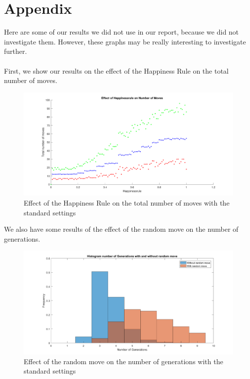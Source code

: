 \section*{Appendix} 

Here are some of our results we did not use in our report, because we did not investigate them.
However, these graphs may be really interesting to investigate further.\\
\\
First, we show our results on the effect of the Happiness Rule on the total number of moves.

\begin{figure}[H]
	\centering
    \includegraphics[width=\textwidth]{happinessregel-aantmov.pdf}
    \caption{Effect of the Happiness Rule on the total number of moves with the standard settings}
    \label{fig:AantGenS}
\end{figure}

We also have some results of the effect of the random move on the number of generations.

\begin{figure}[H]
	\centering
    \includegraphics[width=\textwidth]{histaantgenrandverp.pdf}
    \caption{Effect of the random move on the number of generations with the standard settings}
    \label{fig:AantGenS}
\end{figure}

